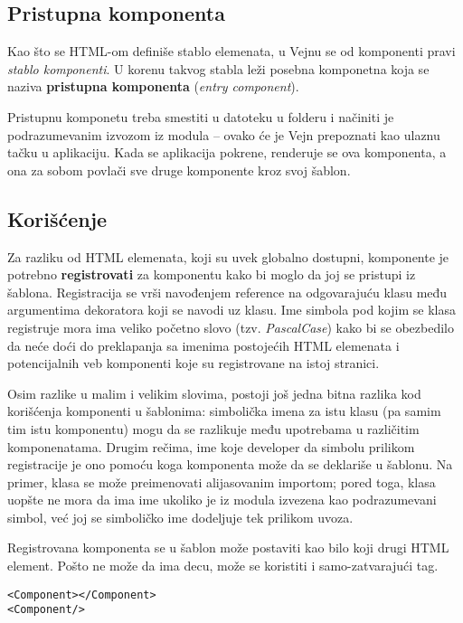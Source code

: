 \subsection{Pristupna komponenta}
\label{subsec:pristupna-komponenta}

Kao što se HTML-om definiše stablo elemenata, u Vejnu se od komponenti pravi \emph{stablo komponenti}.
U korenu takvog stabla leži posebna komponetna koja se naziva \textbf{pristupna komponenta} (\textsl{entry component}).

Pristupnu komponetu treba smestiti u datoteku  u folderu  i načiniti je podrazumevanim izvozom iz modula -- ovako će je Vejn prepoznati kao ulaznu tačku u aplikaciju.
Kada se aplikacija pokrene, renderuje se ova komponenta, a ona za sobom povlači sve druge komponente kroz svoj šablon.

\subsection{Korišćenje}

Za razliku od HTML elemenata, koji su uvek globalno dostupni, komponente je potrebno \textbf{registrovati} za komponentu kako bi moglo da joj se pristupi iz šablona.
Registracija se vrši navođenjem reference na odgovarajuću klasu među argumentima dekoratora  koji se navodi uz klasu.
Ime simbola pod kojim se klasa registruje mora ima veliko početno slovo (tzv. \textsl{PascalCase}) kako bi se obezbedilo da neće doći do preklapanja sa imenima postojećih HTML elemenata i potencijalnih veb komponenti koje su registrovane na istoj stranici.

Osim razlike u malim i velikim slovima, postoji još jedna bitna razlika kod korišćenja komponenti u šablonima: simbolička imena za istu klasu (pa samim tim istu komponentu) mogu da se razlikuje među upotrebama u različitim komponenatama.
Drugim rečima, ime koje developer da simbolu prilikom registracije je ono pomoću koga komponenta može da se deklariše u šablonu.
Na primer, klasa se može preimenovati alijasovanim importom; pored toga, klasa uopšte ne mora da ima ime ukoliko je iz modula izvezena kao podrazumevani simbol, već joj se simboličko ime dodeljuje tek prilikom uvoza.

Registrovana komponenta se u šablon može postaviti kao bilo koji drugi HTML element.
Pošto ne može da ima decu, može se koristiti i samo-zatvarajući tag.

\begin{verbatim}
<Component></Component>
<Component/>
\end{verbatim}

